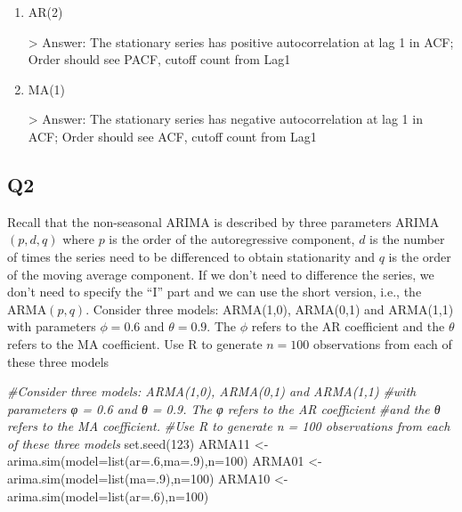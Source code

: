 \documentclass[
]{article}
\newenvironment{Shaded}{\begin{snugshade}}{\end{snugshade}}
\newcommand{\AttributeTok}[1]{\textcolor[rgb]{0.77,0.63,0.00}{#1}}
\newcommand{\CommentTok}[1]{\textcolor[rgb]{0.56,0.35,0.01}{\textit{#1}}}
\newcommand{\DecValTok}[1]{\textcolor[rgb]{0.00,0.00,0.81}{#1}}
\newcommand{\FunctionTok}[1]{\textcolor[rgb]{0.00,0.00,0.00}{#1}}
\newcommand{\NormalTok}[1]{#1}
\newcommand{\OtherTok}[1]{\textcolor[rgb]{0.56,0.35,0.01}{#1}}
\begin{document}
\begin{enumerate}[label=(\alph*)]

\item AR(2)

> Answer: The stationary series has positive autocorrelation at lag 1 in ACF; Order should see PACF, cutoff count from Lag1

\item MA(1)

> Answer: The stationary series has negative autocorrelation at lag 1 in ACF; Order should see ACF, cutoff count from Lag1

\end{enumerate}

\hypertarget{q2}{%
\subsection{Q2}\label{q2}}

Recall that the non-seasonal ARIMA is described by three parameters
ARIMA\((p,d,q)\) where \(p\) is the order of the autoregressive
component, \(d\) is the number of times the series need to be
differenced to obtain stationarity and \(q\) is the order of the moving
average component. If we don't need to difference the series, we don't
need to specify the ``I'' part and we can use the short version, i.e.,
the ARMA\((p,q)\). Consider three models: ARMA(1,0), ARMA(0,1) and
ARMA(1,1) with parameters \(\phi=0.6\) and \(\theta= 0.9\). The \(\phi\)
refers to the AR coefficient and the \(\theta\) refers to the MA
coefficient. Use R to generate \(n=100\) observations from each of these
three models

\begin{Shaded}
\begin{Highlighting}[]
\CommentTok{\#Consider three models: ARMA(1,0), ARMA(0,1) and ARMA(1,1) }
\CommentTok{\#with parameters φ = 0.6 and θ = 0.9. The φ refers to the AR coefficient }
\CommentTok{\#and the θ refers to the MA coefficient. }
\CommentTok{\#Use R to generate n = 100 observations from each of these three models}
\FunctionTok{set.seed}\NormalTok{(}\DecValTok{123}\NormalTok{)}
\NormalTok{ARMA11 }\OtherTok{\textless{}{-}} \FunctionTok{arima.sim}\NormalTok{(}\AttributeTok{model=}\FunctionTok{list}\NormalTok{(}\AttributeTok{ar=}\NormalTok{.}\DecValTok{6}\NormalTok{,}\AttributeTok{ma=}\NormalTok{.}\DecValTok{9}\NormalTok{),}\AttributeTok{n=}\DecValTok{100}\NormalTok{)}
\NormalTok{ARMA01 }\OtherTok{\textless{}{-}} \FunctionTok{arima.sim}\NormalTok{(}\AttributeTok{model=}\FunctionTok{list}\NormalTok{(}\AttributeTok{ma=}\NormalTok{.}\DecValTok{9}\NormalTok{),}\AttributeTok{n=}\DecValTok{100}\NormalTok{)}
\NormalTok{ARMA10 }\OtherTok{\textless{}{-}} \FunctionTok{arima.sim}\NormalTok{(}\AttributeTok{model=}\FunctionTok{list}\NormalTok{(}\AttributeTok{ar=}\NormalTok{.}\DecValTok{6}\NormalTok{),}\AttributeTok{n=}\DecValTok{100}\NormalTok{)}
\end{Highlighting}
\end{Shaded}
\end{document}
